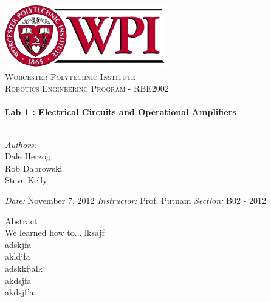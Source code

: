 \begin{titlepage}

\begin{center}


\includegraphics{wpi_logo.jpg}\\[1cm]

\textsc{\LARGE Worcester Polytechnic Institute}\\[1cm]

\textsc{\Large Robotics Engineering Program - RBE2002}\\[1cm]


\HRule \\[1cm]
{ \huge \bfseries Lab 1 : Electrical Circuits and Operational Amplifiers}\\[1cm]

\HRule \\[1cm]

\begin{minipage}{0.4\textwidth}
\begin{flushleft} \large
\emph{Authors:}\\
Dale Herzog \\
Rob Dabrowski \\
Steve Kelly \\
\end{flushleft}
\end{minipage}
\begin{minipage}{0.4\textwidth}
\begin{flushright} \large
\emph{Date:} 
November 7, 2012 
\emph{Instructor:} 
Prof. Putnam 
\emph{Section:} 
B02 - 2012
\end{flushright}
\end{minipage}

\vfill
\end{center}

{ \Large Abstract } \\
    We learned how to...
lksajf\\
 adskjfa \\
akldjfa\\
adskkfjalk\\
akdsjfa\\
akdsjf'a\\

\end{titlepage}
